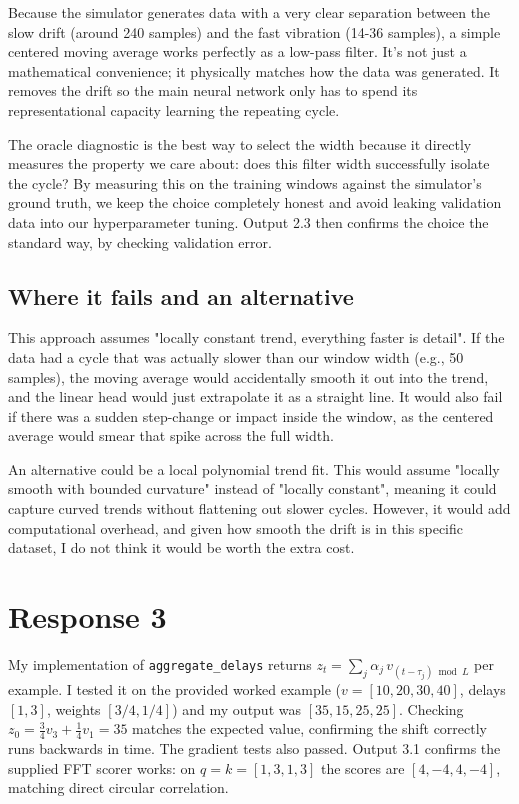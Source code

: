 \documentclass[11pt,letterpaper]{article}
\begin{document}
Because the simulator generates data with a very clear separation between the slow drift (around 240 samples) and the fast vibration (14-36 samples), a simple centered moving average works perfectly as a low-pass filter. It's not just a mathematical convenience; it physically matches how the data was generated. It removes the drift so the main neural network only has to spend its representational capacity learning the repeating cycle.

The oracle diagnostic is the best way to select the width because it directly measures the property we care about: {does this filter width successfully isolate the cycle?} By measuring this on the training windows against the simulator's ground truth, we keep the choice completely honest and avoid leaking validation data into our hyperparameter tuning. Output 2.3 then confirms the choice the standard way, by checking validation error.

\subsection*{Where it fails and an alternative}

This approach assumes "locally constant trend, everything faster is detail". If the data had a cycle that was actually slower than our window width (e.g., 50 samples), the moving average would accidentally smooth it out into the trend, and the linear head would just extrapolate it as a straight line. It would also fail if there was a sudden step-change or impact inside the window, as the centered average would smear that spike across the full width. 

An alternative could be a local polynomial trend fit. This would assume "locally smooth with bounded curvature" instead of "locally constant", meaning it could capture curved trends without flattening out slower cycles. However, it would add computational overhead, and given how smooth the drift is in this specific dataset, I do not think it would be worth the extra cost.

\vspace{10pt}


\section*{Response 3}

My implementation of \texttt{aggregate\_delays} returns $z_t = \sum_j \alpha_j\, v_{(t-\tau_j) \bmod L}$ per example. I tested it on the provided worked example ($v = [10,20,30,40]$, delays $[1,3]$, weights $[3/4,1/4]$) and my output was $[35,15,25,25]$. Checking $z_0 = \tfrac34 v_3 + \tfrac14 v_1 = 35$ matches the expected value, confirming the shift correctly runs backwards in time. The gradient tests also passed. Output 3.1 confirms the supplied FFT scorer works: on $q = k = [1,3,1,3]$ the scores are $[4,-4,4,-4]$, matching direct circular correlation.
\end{document}
